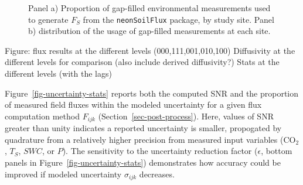 \documentclass[
  letterpaper,
  DIV=11,
  numbers=noendperiod]{scrartcl}
\begin{document}
\begin{figure}


\caption{\label{fig-gap-filled-stats}Panel a) Proportion of gap-filled
environmental measurements used to generate \(F_{S}\) from the
\texttt{neonSoilFlux} package, by study site. Panel b) distribution of
the usage of gap-filled measurements at each site.}

\end{figure}%

Figure: flux results at the different levels (000,111,001,010,100)
Diffusivity at the different levels for comparison (also include derived
diffusivity?) Stats at the different levels (with the lags)

Figure~\ref{fig-uncertainty-stats} reports both the computed SNR and the
proportion of measured field fluxes within the modeled uncertainty for a
given flux computation method \(F_{ijk}\)
(Section~\ref{sec-post-process}). Here, values of SNR greater than unity
indicates a reported uncertainty is smaller, propogated by quadrature
from a relatively higher precision from measured input variables
(CO\(_{2}\), \(T_{S}\), \(SWC\), or \(P\)). The sensitivity to the
uncertainty reduction factor (\(\epsilon\), bottom panels in
Figure~\ref{fig-uncertainty-stats}) demonstrates how accuracy could be
improved if modeled uncertainty \(\sigma_{ijk}\) decreases.
\end{document}
